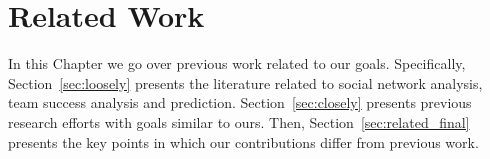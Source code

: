\chapter{Related Work}
In this Chapter we go over previous work related to our goals. Specifically,
Section~\ref{sec:loosely} presents the literature related to social network
analysis, team success analysis and prediction. Section~\ref{sec:closely}
presents previous research efforts with goals similar to ours. Then,
Section~\ref{sec:related_final} presents the key points in which our
contributions differ from previous work.

\label{chapter:related}



